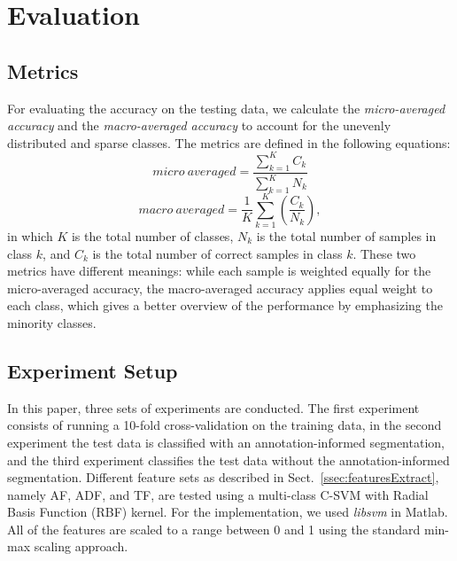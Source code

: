 \documentclass{article}
\begin{document}

\section{Evaluation}\label{sec:eval}
\subsection{Metrics}\label{ssec:metrics}
For evaluating the accuracy on the testing data, we calculate the \textit{micro-averaged accuracy} and the \textit{macro-averaged accuracy}\cite{yang1999} to account for the unevenly distributed and sparse classes. The metrics are defined in the following equations:
\begin{equation}
micro~averaged = \frac{ \sum_{k = 1}^{K} C_{k} }{ \sum_{k = 1}^{K} N_{k} }
\end{equation}
\begin{equation}
macro~averaged = \frac{1}{K} \sum_{k = 1}^{K} (\frac{C_{k}}{N_{k}}),
\end{equation}
in which $K$ is the total number of classes, $N_{k}$ is the total number of samples in class $k$, and $C_{k}$ is the total number of correct samples in class $k$. These two metrics have different meanings: while each sample is weighted equally for the micro-averaged accuracy, the macro-averaged accuracy applies equal weight to each class, which gives a better overview of the performance by emphasizing the minority classes.

\subsection{Experiment Setup}
In this paper, three sets of experiments are conducted. The first experiment consists of running a 10-fold cross-validation on the training data, in the second experiment the test data is classified with an annotation-informed segmentation, and the third experiment classifies the test data without the annotation-informed segmentation. Different feature sets as described in Sect.~\ref{ssec:featuresExtract}, namely AF, ADF, and TF, are tested using a multi-class C-SVM with Radial Basis Function (RBF) kernel. For the implementation, we used \textit{libsvm}\cite{Chang2011} in Matlab.  All of the features are scaled to a range between 0 and 1 using the standard min-max scaling approach.
\end{document}
